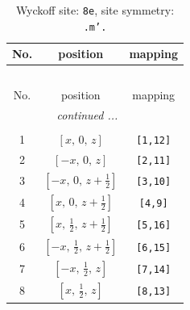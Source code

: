 \documentclass[fleqn,8pt]{jsarticle}
\begin{document}
\renewcommand{\arraystretch}{1.2}
\begin{longtable}{ccc}
\caption{Wyckoff site: {\tt 8e}, site symmetry: {\tt .m'.}}
 \\
 \hline \hline
No. & position & mapping \\ \hline \endfirsthead

\multicolumn{2}{l}{\tablename\ \thetable{}} \\
 \hline \hline
No. & position & mapping \\ \hline \endhead

 \hline \hline
\multicolumn{2}{r}{\footnotesize\it continued ...} \\ \endfoot

 \hline \hline
\multicolumn{2}{r}{} \\ \endlastfoot

1 & $\left[ x,\, 0,\, z \right]$ & {\tt [1,12]} \\ \hline
2 & $\left[ - x,\, 0,\, z \right]$ & {\tt [2,11]} \\ \hline
3 & $\left[ - x,\, 0,\, z + \frac{1}{2} \right]$ & {\tt [3,10]} \\ \hline
4 & $\left[ x,\, 0,\, z + \frac{1}{2} \right]$ & {\tt [4,9]} \\ \hline
5 & $\left[ x,\, \frac{1}{2},\, z + \frac{1}{2} \right]$ & {\tt [5,16]} \\ \hline
6 & $\left[ - x,\, \frac{1}{2},\, z + \frac{1}{2} \right]$ & {\tt [6,15]} \\ \hline
7 & $\left[ - x,\, \frac{1}{2},\, z \right]$ & {\tt [7,14]} \\ \hline
8 & $\left[ x,\, \frac{1}{2},\, z \right]$ & {\tt [8,13]} \\
\end{longtable}
\renewcommand{\arraystretch}{1.2}
\end{document}
